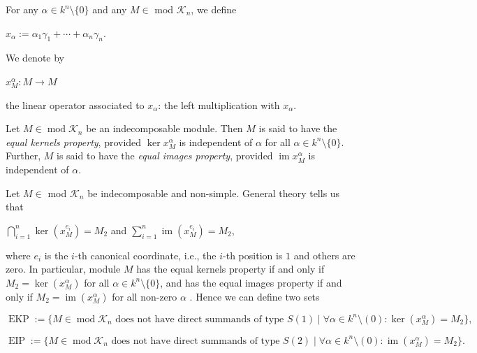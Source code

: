 \documentclass[a4paper,12pt]{amsart}
\DeclareMathOperator{\modd}{mod}
\DeclareMathOperator{\im}{im}
\DeclareMathOperator{\EIP}{EIP}
\DeclareMathOperator{\EKP}{EKP}
\newenvironment{Definition}[1][Definition.]{\begin{trivlist}
\item[\hskip \labelsep {\bfseries #1}]}{\end{trivlist}}
\begin{document}
\quad

















 For any $\alpha \in k^n \setminus \{0\}$ and any $M\in$  mod $\mathcal{K}_n$, we define 
 \begin{center}
  $x_{\alpha}:= \alpha_1\gamma_1+\cdots+ \alpha_n\gamma_n$.
 \end{center}
We denote by
\begin{center}
 $x^{\alpha}_{M}: M \rightarrow M$
\end{center}
 the linear operator associated to $x_{\alpha}$: the left multiplication with $x_{\alpha}$. 


\begin{Definition}
Let $M\in\modd \mathcal{K}_n$ be an indecomposable module.    Then $M$ is said to have the \textit{equal kernels property},  provided  $\ker x^{\alpha}_{M}$ is independent of $\alpha$ for all $\alpha \in k^n \setminus \{0\}$. Further, $M$ is said to have the \textit{equal images property}, provided $\im x^{\alpha}_{M}$ is independent of $\alpha$.
\end{Definition}

 
 
 



Let $M\in$ mod $\mathcal{K}_n$ be indecomposable and non-simple. General theory tells us that 
\begin{center}
$\bigcap^n_{i=1} \ker(x^{e_i}_{M}) = M_2$ and $\sum^n_{i=1} \im(x^{e_i}_{M}) = M_2$,
\end{center}
where $e_i$ is the $i$-th canonical coordinate, i.e., the $i$-th position is $1$ and others are zero. In particular,  module $M$ has the equal kernels property if and only if $M_2 = \ker(x^{\alpha}_{M})$ for all $\alpha \in k^n \setminus \{0\}$, and has the equal images property if and only if $M_2 = \im(x^{\alpha}_{M})$ for all non-zero $\alpha$ \cite[Lemma 2.20]{Daniel}. Hence   we  can define two sets 
 
 
\[ \EKP := \{M \in \modd \mathcal{K}_n \text{ does not have direct summands of type } S(1) \mid  \forall \alpha \in k^n \setminus (0): \ker(x^{\alpha}_{M}) =  M_2 \},\]


\[ \EIP := \{M \in  \modd \mathcal{K}_n \text{ does not have direct summands of type }S(2) \mid  \forall \alpha \in k^n \setminus (0): \im(x^{\alpha}_{M}) =  M_2 \}.\]
\end{document}
